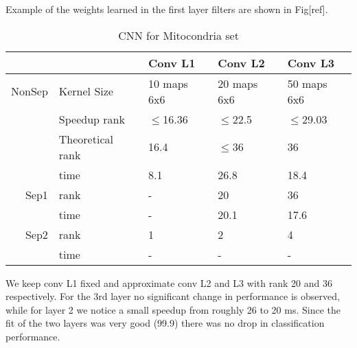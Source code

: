 Example of the weights learned in the first layer filters are shown in Fig[ref]. 

\begin{table}
\centering
\begin{tabular}{@{}rllll@{}}\toprule
 &&Conv L1& Conv L2 & Conv L3\\ \midrule
NonSep &Kernel Size & 10 maps 6x6& 20 maps 6x6 & 50 maps 6x6\\
&Speedup rank& $\leq$16.36 & $\leq$22.5 & $\leq$29.03\\
&Theoretical rank & 16.4 & $\leq$36 & 36 \\ 
&time & 8.1 & 26.8 & 18.4 \\ \midrule
Sep1& rank & - & 20 & 36 \\ 
& time& - & 20.1 & 17.6\\ \midrule
Sep2& rank & 1 & 2 & 4 \\ 
& time& - & - & -\\ \bottomrule
\end{tabular}
\caption{CNN for Mitocondria set}
\label{fig:CNN3}
\end{table}

We keep conv L1 fixed and approximate conv L2 and L3 with rank 20 and 36 respectively. For the 3rd layer no significant change in performance is observed, while for layer 2 we notice a small speedup from roughly 26 to 20 ms. Since the fit of the two layers was very good (99.9) there was no drop in classification performance.